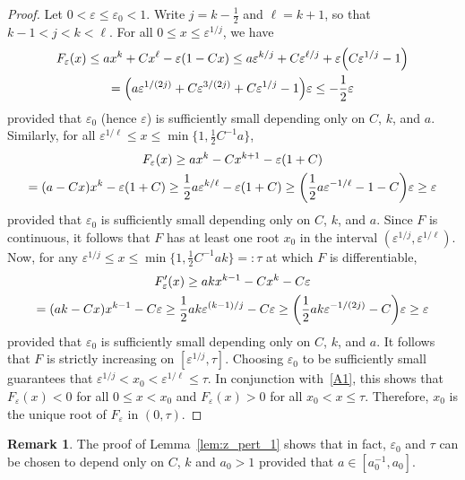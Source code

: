 \documentclass[10pt]{amsart}
\theoremstyle{definition}\newtheorem{defi}[theo]{Definition}\newtheorem{rema}[theo]{Remark}\newtheorem{exam}[theo]{Example}\newtheorem{exem}[theo]{Example}\newtheorem{nota}[theo]{Notation}
\renewcommand{\epsilon}{\varepsilon}
\let\originalleft\left
\let\originalright\right
\renewcommand{\left}{\mathopen{}\mathclose\bgroup\originalleft}
\renewcommand{\right}{\aftergroup\egroup\originalright}
\begin{document}
\begin{proof}
Let $0<\epsilon\leq \epsilon_0<1$. Write $j=k-\frac{1}{2}$ and $\ell=k+1$, so that $k-1<j<k<\ell$. For all $0\leq x\leq \epsilon^{1/j}$, we have
\begin{multline}\label{A1}
F_\epsilon(x) \leq ax^{k}+Cx^{\ell}-\epsilon(1-Cx)\leq a\epsilon^{k/j}+C\epsilon^{\ell/j}+\epsilon \left(C\epsilon^{1/j}-1\right)\\
=\left(a\epsilon^{1/(2j)}+C\epsilon^{3/(2j)} +C\epsilon^{1/j}-1\right)\epsilon\leq -\frac{1}{2}\epsilon
\end{multline}
provided that $\epsilon_0$ (hence $\epsilon$) is sufficiently small depending only on $C$, $k$, and $a$. Similarly, for all $\epsilon^{1/\ell}\leq x \leq \min\{1,\frac{1}{2}C^{-1}a\}$,
\begin{multline}
F_\epsilon(x) \geq ax^{k}-Cx^{k+1}-\epsilon(1+C)\\
= (a-Cx)x^k-\epsilon(1+C)
\geq \frac{1}{2}a \epsilon^{k/\ell}-\epsilon(1+C)\geq \left(\frac12a \epsilon^{-1/\ell}-1-C\right)\epsilon\geq \epsilon
\end{multline}
provided that $\epsilon_0$ is sufficiently small depending only on $C$, $k$, and $a$. Since $F$ is continuous, it follows that $F$ has at least one root $x_0$ in the interval $(\epsilon^{1/j},\epsilon^{1/\ell})$. Now, for any $\epsilon^{1/j}\leq x\leq \min\{1,\frac{1}{2}C^{-1}ak\}=:\tau$ at which $F$ is differentiable,
\begin{multline}
F_\epsilon'(x) \geq ak x^{k-1}-Cx^k-C\epsilon\\
=(ak-Cx)x^{k-1}-C\epsilon
\geq \frac{1}{2}ak \epsilon^{(k-1)/j}-C\epsilon\geq \left(\frac{1}{2}ak\epsilon^{-1/(2j)}-C\right)
\epsilon\geq\epsilon
\end{multline}
provided that $\epsilon_0$ is sufficiently small depending only on $C$, $k$, and $a$. It follows that $F$ is strictly increasing on $[\epsilon^{1/j},\tau]$. Choosing $\epsilon_0$ to be sufficiently small guarantees that $\epsilon^{1/j}<x_0<\epsilon^{1/\ell}\leq \tau$. In conjunction with~\eqref{A1}, this shows that $F_\epsilon(x)<0$ for all $0\leq x<x_0$ and $F_\epsilon(x)>0$ for all $x_0<x\leq \tau$. Therefore, $x_0$ is the unique root of $F_\epsilon$ in $(0,\tau)$.
\end{proof}

\begin{rema}\label{rmk:zero}
The proof of Lemma~\ref{lem:z_pert_1} shows that in fact, $\epsilon_0$ and $\tau$ can be chosen to depend only on $C$, $k$ and $a_0 >1$ provided that $a \in [a_0^{-1}, a_0]$.
\end{rema}
\end{document}
